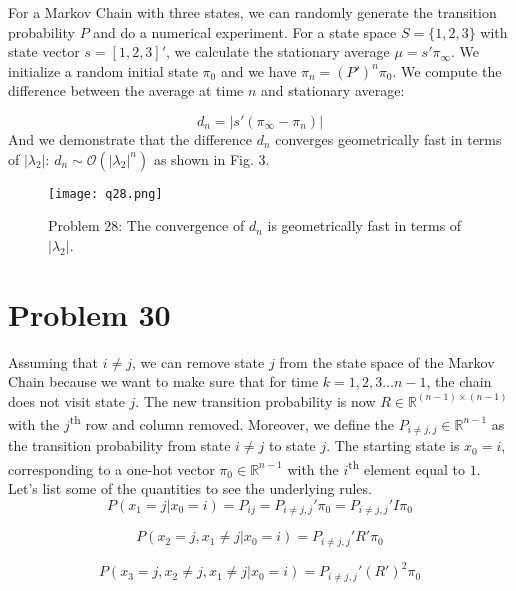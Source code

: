\documentclass[a4paper, 11pt]{article}
\begin{document}
For a Markov Chain with three states, we can randomly generate the transition probability $P$ and do a numerical experiment. For a state space $S = \{1, 2, 3\}$ with state vector $s = [1, 2, 3]'$, we calculate the stationary average $\mu = s'\pi_\infty$. We initialize a random initial state $\pi_0$ and we have $\pi_n = (P')^n\pi_0$. We compute the difference between the average at time $n$ and stationary average: 

\begin{equation}
d_n = |s'(\pi_\infty - \pi_n)|
\end{equation}
And we demonstrate that the difference $d_n$ converges geometrically fast in terms of $|\lambda_2|$: $d_n \sim \mathcal{O}(|\lambda_2|^n)$ as shown in Fig. 3. 

\begin{figure}
	\begin{center}
		\texttt{[image: q28.png]}
		\caption{Problem 28: The convergence of $d_n$ is geometrically fast in terms of $|\lambda_2|$. }
	\end{center}
\end{figure}

\section*{Problem 30}

Assuming that $i \neq j$, we can remove state $j$ from the state space of the Markov Chain because we want to make sure that for time $k = 1, 2, 3 \dots n-1$, the chain does not visit state $j$. The new transition probability is now $R \in \mathbb{R}^{(n-1)\times (n-1)}$ with the $j$\textsuperscript{th} row and column removed. Moreover, we define the $P_{i\neq j, j} \in \mathbb{R}^{n-1}$ as the transition probability from state $i\neq j$ to state $j$. The starting state is $x_0 = i$, corresponding to a one-hot vector $\pi_0 \in \mathbb{R}^{n-1}$ with the $i$\textsuperscript{th} element equal to $1$. Let's list some of the quantities to see the underlying rules. 
\begin{equation}
P(x_1 = j | x_0 = i) = P_{ij} = P_{i\neq j, j}' \pi_0 = P_{i\neq j, j}' I \pi_0 
\end{equation}

\begin{equation}
P(x_2 = j, x_1 \neq j | x_0 = i) = P_{i\neq j, j}' R' \pi_0
\end{equation}

\begin{equation}
P(x_3 = j, x_2 \neq j, x_1 \neq j | x_0 = i) = P_{i\neq j, j}' (R')^2 \pi_0
\end{equation}
\end{document}
